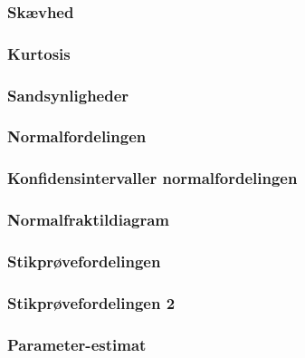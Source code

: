 \documentclass[]{book}
\begin{document}
\hypertarget{skvhed}{%
\subsubsection{Skævhed}\label{skvhed}}

\hypertarget{kurtosis}{%
\subsubsection{Kurtosis}\label{kurtosis}}

\hypertarget{sandsynligheder}{%
\subsubsection{Sandsynligheder}\label{sandsynligheder}}

\hypertarget{normalfordelingen}{%
\subsubsection{Normalfordelingen}\label{normalfordelingen}}

\hypertarget{konfidensintervaller-normalfordelingen}{%
\subsubsection{Konfidensintervaller normalfordelingen}\label{konfidensintervaller-normalfordelingen}}

\hypertarget{normalfraktildiagram}{%
\subsubsection{Normalfraktildiagram}\label{normalfraktildiagram}}

\hypertarget{stikprvefordelingen}{%
\subsubsection{Stikprøvefordelingen}\label{stikprvefordelingen}}

\hypertarget{stikprvefordelingen-2}{%
\subsubsection{Stikprøvefordelingen 2}\label{stikprvefordelingen-2}}

\hypertarget{parameter-estimat}{%
\subsubsection{Parameter-estimat}\label{parameter-estimat}}
\end{document}
